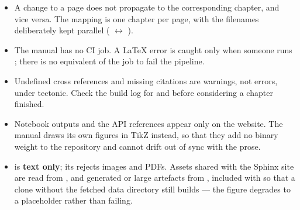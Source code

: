 \begin{itemize}[leftmargin=1.4em]
  \item A change to a  page does not propagate to the corresponding
    chapter, and vice versa. The mapping is one chapter per page, with the
    filenames deliberately kept parallel
    ( $\leftrightarrow$
    ).
  \item The manual has no CI job. A LaTeX error is caught only when someone
    runs ; there is no equivalent of the  job to
    fail the pipeline.
  \item Undefined cross references and missing citations are warnings, not
    errors, under tectonic. Check the build log for
     and
     before considering a chapter finished.
  \item Notebook outputs and the API references appear only on the website. The
    manual draws its own figures in TikZ instead, so that they add no binary
    weight to the repository and cannot drift out of sync with the prose.
  \item {} is \textbf{text only}; its  rejects
    images and PDFs. Assets shared with the Sphinx site are read from
    , and generated or large artefacts from
    , included with 
    so that a clone without the fetched data directory still builds --- the
    figure degrades to a placeholder rather than failing.
\end{itemize}
